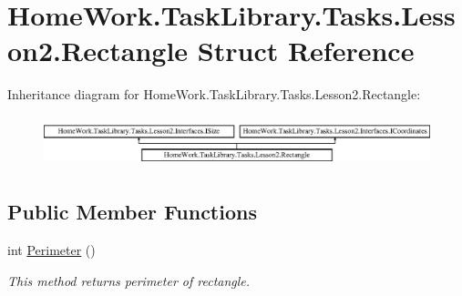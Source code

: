 \hypertarget{struct_home_work_1_1_task_library_1_1_tasks_1_1_lesson2_1_1_rectangle}{}\section{Home\+Work.\+Task\+Library.\+Tasks.\+Lesson2.\+Rectangle Struct Reference}
\label{struct_home_work_1_1_task_library_1_1_tasks_1_1_lesson2_1_1_rectangle}
Inheritance diagram for Home\+Work.\+Task\+Library.\+Tasks.\+Lesson2.\+Rectangle\+:\begin{figure}[H]
\begin{center}
\leavevmode
\includegraphics[height=1.497326cm]{struct_home_work_1_1_task_library_1_1_tasks_1_1_lesson2_1_1_rectangle}
\end{center}
\end{figure}
\subsection*{Public Member Functions}
\begin{DoxyCompactItemize}
\item 
int \mbox{\hyperlink{struct_home_work_1_1_task_library_1_1_tasks_1_1_lesson2_1_1_rectangle_a336f8e9d556a0688ad57efc74e86d51d}{Perimeter}} ()
\begin{DoxyCompactList}\small\item\em This method returns perimeter of rectangle. \end{DoxyCompactList}\end{DoxyCompactItemize}
